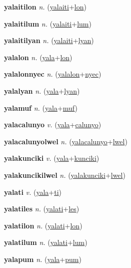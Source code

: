 \textbf{\hypertarget{yalaitilon}{yalaitilon}} \textit{n.} (\hyperlink{yalaiti}{yalaiti}+\allowbreak \hyperlink{lon}{lon})


\textbf{\hypertarget{yalaitilum}{yalaitilum}} \textit{n.} (\hyperlink{yalaiti}{yalaiti}+\allowbreak \hyperlink{lum}{lum})


\textbf{\hypertarget{yalaitilyan}{yalaitilyan}} \textit{n.} (\hyperlink{yalaiti}{yalaiti}+\allowbreak \hyperlink{lyan}{lyan})


\textbf{\hypertarget{yalalon}{yalalon}} \textit{n.} (\hyperlink{yala}{yala}+\allowbreak \hyperlink{lon}{lon})


\textbf{\hypertarget{yalalonnyec}{yalalonnyec}} \textit{n.} (\hyperlink{yalalon}{yalalon}+\allowbreak \hyperlink{nyec}{nyec})


\textbf{\hypertarget{yalalyan}{yalalyan}} \textit{n.} (\hyperlink{yala}{yala}+\allowbreak \hyperlink{lyan}{lyan})


\textbf{\hypertarget{yalamuf}{yalamuf}} \textit{n.} (\hyperlink{yala}{yala}+\allowbreak \hyperlink{muf}{muf})


\textbf{\hypertarget{yalacalunyo}{yalacalunyo}} \textit{v.} (\hyperlink{yala}{yala}+\allowbreak \hyperlink{calunyo}{calunyo})


\textbf{\hypertarget{yalacalunyolwel}{yalacalunyolwel}} \textit{n.} (\hyperlink{yalacalunyo}{yalacalunyo}+\allowbreak \hyperlink{lwel}{lwel})


\textbf{\hypertarget{yalakunciki}{yalakunciki}} \textit{v.} (\hyperlink{yala}{yala}+\allowbreak \hyperlink{kunciki}{kunciki})


\textbf{\hypertarget{yalakuncikilwel}{yalakuncikilwel}} \textit{n.} (\hyperlink{yalakunciki}{yalakunciki}+\allowbreak \hyperlink{lwel}{lwel})


\textbf{\hypertarget{yalati}{yalati}} \textit{v.} (\hyperlink{yala}{yala}+\allowbreak \hyperlink{ti}{ti})


\textbf{\hypertarget{yalatiles}{yalatiles}} \textit{n.} (\hyperlink{yalati}{yalati}+\allowbreak \hyperlink{les}{les})


\textbf{\hypertarget{yalatilon}{yalatilon}} \textit{n.} (\hyperlink{yalati}{yalati}+\allowbreak \hyperlink{lon}{lon})


\textbf{\hypertarget{yalatilum}{yalatilum}} \textit{n.} (\hyperlink{yalati}{yalati}+\allowbreak \hyperlink{lum}{lum})


\textbf{\hypertarget{yalapum}{yalapum}} \textit{n.} (\hyperlink{yala}{yala}+\allowbreak \hyperlink{pum}{pum})


